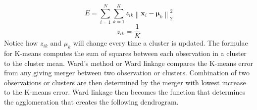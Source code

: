 \documentclass{article}
\begin{document}
\begin{equation}
E=\sum_{i=1}^{N} \sum_{k=1}^{K} z_{i k}\left\|\boldsymbol{x}_{i}-\boldsymbol{\mu}_{k}\right\|_{2}^{2}
\end{equation}
\begin{equation}
z_{i k} = \frac{1}{K}
\end{equation}
Notice how $z_{ik}$ and $\mu_{k}$ will change every time a cluster is updated.
The formulae for K-means computes the sum of squares between each observation in a cluster to the cluster mean.
Ward's method or Ward linkage compares the K-means error from any giving merger between two observation or clusters. Combination of two observations or clusters are then determined by the merger with lowest increase to the K-means error.
Ward linkage then becomes the function that determines the agglomeration that creates the following dendrogram.




\end{document}
